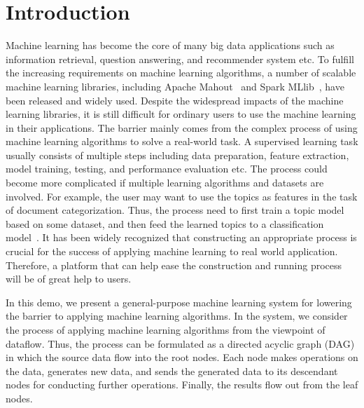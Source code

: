 \documentclass{sig-alternate-05-2015}
\begin{document}

\section{Introduction}
Machine learning has become the core of many big data applications such as information retrieval, question answering, and recommender system etc. To fulfill the increasing requirements on machine learning algorithms, a number of scalable machine learning libraries, including Apache Mahout~\cite{Mahout} and Spark MLlib~\cite{SparkMLLib}, have been released and widely used. Despite the widespread impacts of the machine learning libraries, it is still difficult for ordinary users to use the machine learning in their applications. The barrier mainly comes from the complex process of using machine learning algorithms to solve a real-world task. A supervised learning task usually consists of multiple steps including data preparation, feature extraction, model training, testing, and performance evaluation etc. The process could become more complicated if multiple learning algorithms and datasets are involved. For example, the user may want to use the topics as features in the task of document categorization. Thus, the process need to first train a topic model based on some dataset, and then feed the learned topics to a classification model~\cite{XXX}. It has been widely recognized that constructing an appropriate process is crucial for the success of applying machine learning to real world application. Therefore, a platform that can help ease the construction and running process will be of great help to users.

In this demo, we present a general-purpose machine learning system for lowering the barrier to applying machine learning algorithms. In the system, we consider the process of applying machine learning algorithms from the viewpoint of dataflow. Thus, the process can be formulated as a directed acyclic graph (DAG) in which the source data flow into the root nodes. Each node makes operations on the data, generates new data, and sends the generated data to its descendant nodes for conducting further operations. Finally, the results flow out from the leaf nodes.
\end{document}
